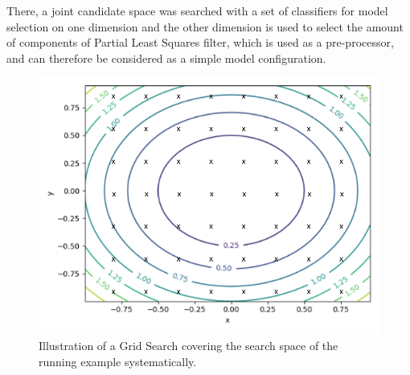 There, a joint candidate space was searched with a set of classifiers for model selection on one dimension and the other dimension is used to select the amount of components of Partial Least Squares filter, which is used as a pre-processor, and can therefore be considered as a simple model configuration.
\begin{figure}[ht!]
    \centering
    \includegraphics[width=\textwidth]{gfx/Figures/Theory/GridSearch.pdf}
    \caption{Illustration of a Grid Search covering the search space of the running example systematically.}
    \label{fig:theory:grid-search}
\end{figure}


